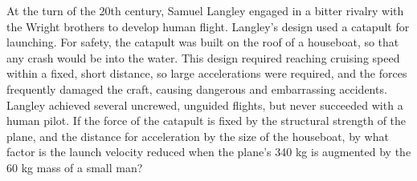 At the turn of the 20th century, Samuel Langley engaged in a bitter rivalry with
the Wright brothers to develop human flight. Langley's design used a catapult for launching. For safety,
the catapult was built on the roof of a houseboat, so that any crash would be into the water.
This design required reaching cruising speed within a fixed, short distance, so large
accelerations were required, and the forces frequently damaged the craft, causing dangerous
and embarrassing accidents. Langley achieved several uncrewed, unguided flights,
but never succeeded with a human pilot. If the force of the catapult is fixed by the
structural strength of the plane, and the distance for acceleration by the size of the
houseboat, by what factor is the launch velocity reduced when the plane's
340 kg is augmented by the 60 kg mass of a small man?\answercheck
